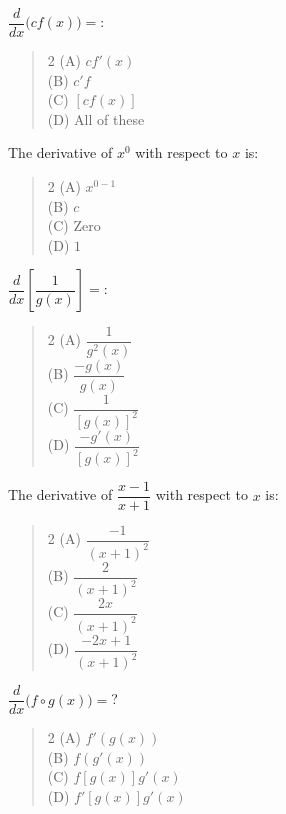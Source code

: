 \documentclass[11pt,a4paper]{article}
\begin{document}
\begin{mcqlist}
\item $\dfrac{d}{dx}\big(cf(x)\big) = $:
\begin{quote}\begin{multicols}{2}
\noindent (A) $cf'(x)$ \\
(B) $c'f$ \\
(C) $[cf(x)]$ \\
(D) All of these
\end{multicols}\end{quote}

\item The derivative of $x^0$ with respect to $x$ is:
\begin{quote}\begin{multicols}{2}
\noindent (A) $x^{0-1}$ \\
(B) $c$ \\
(C) Zero \\
(D) $1$
\end{multicols}\end{quote}

\item $\dfrac{d}{dx}\left[\dfrac{1}{g(x)}\right] = $:
\begin{quote}\begin{multicols}{2}
\noindent (A) $\dfrac{1}{g^2(x)}$ \\
(B) $\dfrac{-g(x)}{g(x)}$ \\
(C) $\dfrac{1}{[g(x)]^2}$ \\
(D) $\dfrac{-g'(x)}{[g(x)]^2}$
\end{multicols}\end{quote}

\item The derivative of $\dfrac{x-1}{x+1}$ with respect to $x$ is:
\begin{quote}\begin{multicols}{2}
\noindent (A) $\dfrac{-1}{(x+1)^2}$ \\
(B) $\dfrac{2}{(x+1)^2}$ \\
(C) $\dfrac{2x}{(x+1)^2}$ \\
(D) $\dfrac{-2x+1}{(x+1)^2}$
\end{multicols}\end{quote}

\item $\dfrac{d}{dx}\big(f\circ g(x)\big) = $?
\begin{quote}\begin{multicols}{2}
\noindent (A) $f'(g(x))$ \\
(B) $f(g'(x))$ \\
(C) $f[g(x)]g'(x)$ \\
(D) $f'[g(x)]g'(x)$
\end{multicols}\end{quote}


\end{mcqlist}
\end{document}
